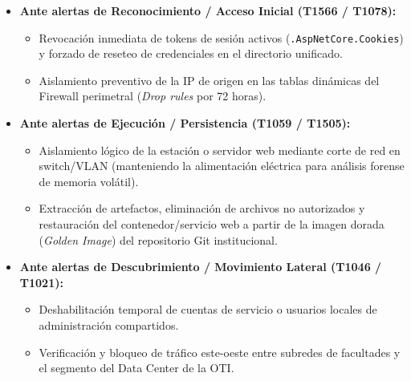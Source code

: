 \begin{itemize}
    \item \textbf{Ante alertas de Reconocimiento / Acceso Inicial (T1566 / T1078):}
    \begin{itemize}
        \item Revocación inmediata de tokens de sesión activos (\texttt{.AspNetCore.Cookies}) y forzado de reseteo de credenciales en el directorio unificado.
        \item Aislamiento preventivo de la IP de origen en las tablas dinámicas del Firewall perimetral (\textit{Drop rules} por 72 horas).
    \end{itemize}

    \item \textbf{Ante alertas de Ejecución / Persistencia (T1059 / T1505):}
    \begin{itemize}
        \item Aislamiento lógico de la estación o servidor web mediante corte de red en switch/VLAN (manteniendo la alimentación eléctrica para análisis forense de memoria volátil).
        \item Extracción de artefactos, eliminación de archivos no autorizados y restauración del contenedor/servicio web a partir de la imagen dorada (\textit{Golden Image}) del repositorio Git institucional.
    \end{itemize}

    \item \textbf{Ante alertas de Descubrimiento / Movimiento Lateral (T1046 / T1021):}
    \begin{itemize}
        \item Deshabilitación temporal de cuentas de servicio o usuarios locales de administración compartidos.
        \item Verificación y bloqueo de tráfico este-oeste entre subredes de facultades y el segmento del Data Center de la OTI.
    \end{itemize}
\end{itemize}